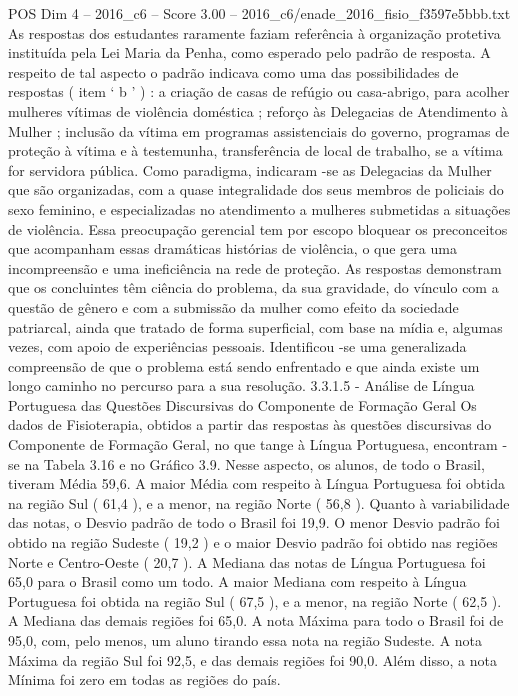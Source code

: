 \begin{textsample}{POS Dim 4 – 2016\_c6 – Score 3.00 – 2016\_c6/enade\_2016\_fisio\_f3597e5bbb.txt}
As respostas dos estudantes raramente faziam referência à organização protetiva instituída pela Lei Maria da Penha, como esperado pelo padrão de resposta.
A respeito de tal aspecto o padrão indicava como uma das possibilidades de respostas ( item ‘ b ’ ) : a criação de casas de refúgio ou casa-abrigo, para acolher mulheres vítimas de violência doméstica ; reforço às Delegacias de Atendimento à Mulher ; inclusão da vítima em programas assistenciais do governo, programas de proteção à vítima e à testemunha, transferência de local de trabalho, se a vítima for servidora pública.
Como paradigma, indicaram -se as Delegacias da Mulher que são organizadas, com a quase integralidade dos seus membros de policiais do sexo feminino, e especializadas no atendimento a mulheres submetidas a situações de violência.
Essa preocupação gerencial tem por escopo bloquear os preconceitos que acompanham essas dramáticas histórias de violência, o que gera uma incompreensão e uma ineficiência na rede de proteção.
As respostas demonstram que os concluintes têm ciência do problema, da sua gravidade, do vínculo com a questão de gênero e com a submissão da mulher como efeito da sociedade patriarcal, ainda que tratado de forma superficial, com base na mídia e, algumas vezes, com apoio de experiências pessoais.
Identificou -se uma generalizada compreensão de que o problema está sendo enfrentado e que ainda existe um longo caminho no percurso para a sua resolução. 3.3.1.5 - Análise de Língua Portuguesa das Questões Discursivas do Componente de Formação Geral Os dados de Fisioterapia, obtidos a partir das respostas às questões discursivas do Componente de Formação Geral, no que tange à Língua Portuguesa, encontram -se na Tabela 3.16 e no Gráfico 3.9.
Nesse aspecto, os alunos, de todo o Brasil, tiveram Média 59,6.
A maior Média com respeito à Língua Portuguesa foi obtida na região Sul ( 61,4 ), e a menor, na região Norte ( 56,8 ).
Quanto à variabilidade das notas, o Desvio padrão de todo o Brasil foi 19,9.
O menor Desvio padrão foi obtido na região Sudeste ( 19,2 ) e o maior Desvio padrão foi obtido nas regiões Norte e Centro-Oeste ( 20,7 ).
A Mediana das notas de Língua Portuguesa foi 65,0 para o Brasil como um todo.
A maior Mediana com respeito à Língua Portuguesa foi obtida na região Sul ( 67,5 ), e a menor, na região Norte ( 62,5 ).
A Mediana das demais regiões foi 65,0.
A nota Máxima para todo o Brasil foi de 95,0, com, pelo menos, um aluno tirando essa nota na região Sudeste.
A nota Máxima da região Sul foi 92,5, e das demais regiões foi 90,0.
Além disso, a nota Mínima foi zero em todas as regiões do país.

\end{textsample}

